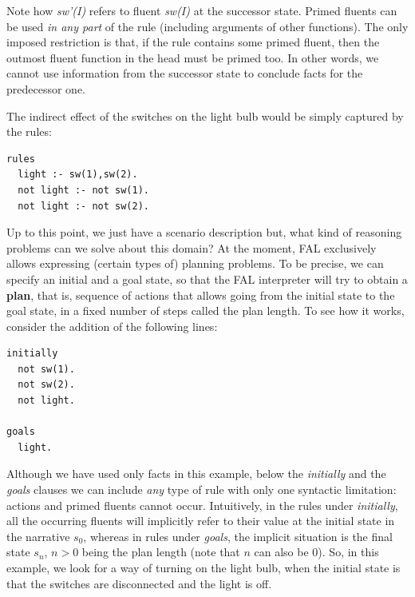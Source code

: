 \documentclass[a4paper,12pt]{report}
\begin{document}
Note how \textit{sw'(I)} refers to fluent \textit{sw(I)} at the successor state. Primed fluents can be used \textit{in any part} of the rule (including arguments of other functions). The only imposed restriction is that, if the rule contains some primed fluent, then the outmost fluent function in the head must be primed too. In other words, we cannot use information from the successor state to conclude facts for the predecessor one.

The indirect effect of the switches on the light bulb would be simply captured by the rules:

\begin{verbatim}
rules
  light :- sw(1),sw(2).
  not light :- not sw(1).
  not light :- not sw(2).
\end{verbatim}

Up to this point, we just have a scenario description but, what kind of reasoning problems can we solve about this domain? At the moment, FAL exclusively allows expressing (certain types of) {\color{orange}planning} problems. To be precise, we can specify an initial and a goal state, so that the FAL interpreter will try to obtain a {\color{red}\textbf{plan}}, that is, sequence of actions that allows going from the initial state to the goal state, in a fixed number of steps called the {\color{orange}plan length}. To see how it works, consider the addition of the following lines:

\begin{verbatim}
initially
  not sw(1).
  not sw(2).
  not light.

goals
  light.
\end{verbatim}

Although we have used only facts in this example, below the \textit{initially} and the \textit{goals} clauses we can include \textit{any} type of rule with only one syntactic limitation: actions and primed fluents cannot occur. Intuitively, in the rules under \textit{initially}, all the occurring fluents will implicitly refer to their value at the initial state in the narrative $s_0$, whereas in rules under \textit{goals}, the implicit situation is the final state $s_n$, $n>0$ being the plan length (note that $n$ can also be $0$). So, in this example, we look for a way of turning on the light bulb, when the initial state is that the switches are disconnected and the light is off.
\end{document}
